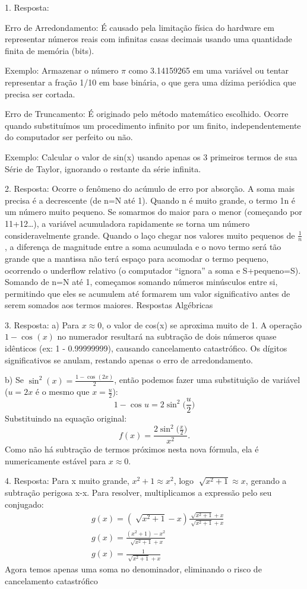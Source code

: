 \documentclass[../numerical_methods.tex]{subfiles}
\begin{document}
1. Resposta:

Erro de Arredondamento: É causado pela limitação física do hardware em representar números reais com infinitas casas decimais usando uma quantidade finita de memória (bits).

Exemplo: Armazenar o número \(\pi \) como 3.14159265 em uma variável ou tentar representar a fração 1/10 em base binária, o que gera uma dízima periódica que precisa ser cortada.

Erro de Truncamento: É originado pelo método matemático escolhido. Ocorre quando substituímos um procedimento infinito por um finito, independentemente do computador ser perfeito ou não.

Exemplo: Calcular o valor de sin(x) usando apenas os 3 primeiros termos de sua Série de Taylor, ignorando o restante da série infinita.

2. Resposta: Ocorre o fenômeno do acúmulo de erro por absorção. A soma mais precisa é a decrescente (de n=N até 1). Quando n é muito grande, o termo 1n é um número muito pequeno. Se somarmos do maior para o menor (começando por 11+12…), a variável acumuladora rapidamente se torna um número consideravelmente grande. Quando o laço chegar nos valores muito pequenos de \(\frac{1}{n}\), a diferença de magnitude entre a soma acumulada e o novo termo será tão grande que a mantissa não terá espaço para acomodar o termo pequeno, ocorrendo o underflow relativo (o computador ``ignora'' a soma e S+pequeno=S). Somando de n=N até 1, começamos somando números minúsculos entre si, permitindo que eles se acumulem até formarem um valor significativo antes de serem somados aos termos maiores.
Respostas Algébricas

3. Resposta: a) Para \(x\approx 0\), o valor de cos(x) se aproxima muito de 1. A operação \(1-\cos^{}{(x)}\) no numerador resultará na subtração de dois números quase idênticos (ex: 1 - 0.99999999), causando cancelamento catastrófico. Os dígitos significativos se anulam, restando apenas o erro de arredondamento.

b) Se \(\displaystyle \sin^{2}{(x)}=\frac{1-\cos^{}{(2x)}}{2}\), então podemos fazer uma substituição de variável (\(u = 2x\) é o mesmo que \(x = \frac{u}{2}\)):
\[
	1-\cos^{}{u} = 2\sin^{2}{}\biggl(\frac{u}{2}\biggr)
\]
Substituindo na equação original:
\[
	f(x) = \frac{2\sin^{2}{}\biggl(\frac{x}{2}\biggr)}{x^{2}}.
\]
Como não há subtração de termos próximos nesta nova fórmula, ela é numericamente estável para \(x\approx 0\).

4. Resposta: Para x muito grande, \(x^{2}+1 \approx x^{2}\), logo \(\sqrt[]{x^{2}+1}\approx x\), gerando a subtração perigosa x-x. Para resolver, multiplicamos a expressão pelo seu conjugado:
\begin{align*}
	 & g(x) = (\sqrt[]{x^{2}+1} - x) \frac{\sqrt[]{x^{2}+1}+x}{\sqrt[]{x^{2}+1}+x} \\
	 & g(x) = \frac{(x^{2}+1)-x^{2}}{\sqrt[]{x^{2}+1}+x}                           \\
	 & g(x) = \frac{1}{\sqrt[]{x^{2}+1}+x}
\end{align*}
Agora temos apenas uma soma no denominador, eliminando o risco de cancelamento catastrófico
\end{document}
